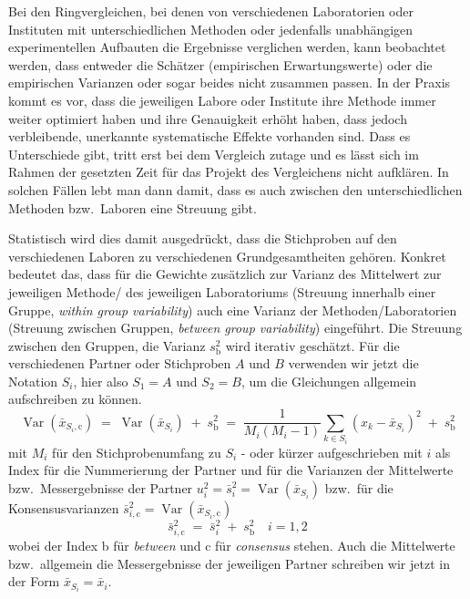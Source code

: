 Bei den Ringvergleichen, bei denen von verschiedenen Laboratorien oder Instituten mit
unterschiedlichen Methoden oder jedenfalls unabhängigen experimentellen Aufbauten die
Ergebnisse verglichen werden, kann beobachtet werden, dass entweder die
Schätzer (empirischen Erwartungswerte) oder die empirischen Varianzen oder sogar
beides nicht zusammen passen. In der Praxis kommt es vor, dass die jeweiligen
Labore oder Institute ihre Methode immer weiter optimiert haben und ihre Genauigkeit
erhöht haben, dass jedoch verbleibende, unerkannte systematische Effekte vorhanden sind.
Dass es Unterschiede gibt, tritt erst bei dem Vergleich zutage und es lässt sich
im Rahmen der gesetzten Zeit für das Projekt des Vergleichens nicht aufklären.
In solchen Fällen lebt man dann damit, dass es auch zwischen den unterschiedlichen
Methoden bzw.\ Laboren eine Streuung gibt.

Statistisch wird dies damit ausgedrückt, dass die Stichproben auf den verschiedenen
Laboren zu verschiedenen Grundgesamtheiten gehören.
Konkret bedeutet das, dass für die Gewichte zusätzlich zur Varianz des Mittelwert
zur jeweiligen Methode/ des jeweiligen Laboratoriums
(Streuung innerhalb einer Gruppe, \textsl{within group variability})
auch eine Varianz der Methoden/Laboratorien (Streuung zwischen Gruppen,
\textsl{between group variability}) eingeführt.
Die Streuung zwischen den Gruppen, die Varianz $s^2_\mathrm{b}$ wird
iterativ geschätzt. Für die verschiedenen Partner oder Stichproben $A$ und $B$
verwenden wir jetzt die Notation $S_i$, hier also $S_1 = A$ und $S_2 = B$, um
die Gleichungen allgemein aufschreiben zu können.
\begin{equation*}
\operatorname{Var}(\bar x_{S_i,\mathrm{c}}) \; = \;
\operatorname{Var}(\bar x_{S_i}) \; + \; s^2_\mathrm{b} \; = \;
\frac{1}{M_i (M_i - 1)} \sum\limits_{k \in S_i}
\left( x_{k} - \bar x_{S_i} \right)^2
\; + \; s^2_\mathrm{b}
\end{equation*}
mit $M_i$ für den Stichprobenumfang zu $S_i$ -
oder kürzer aufgeschrieben mit $i$ als Index für die Nummerierung der Partner
und für die Varianzen der Mittelwerte bzw.\ Messergebnisse
der Partner
$u^2_i = \bar s^2_i = \operatorname{Var}(\bar x_{S_i})$
bzw.\ für die Konsensusvarianzen
$\bar s^2_{i,\mathrm{c}} = \operatorname{Var}(\bar x_{S_i,\mathrm{c}})$
\begin{equation}
\bar s^2_{i,\mathrm{c}} \; = \; \bar s^2_i \; + \; s^2_\mathrm{b}
\quad i=1,2
\label{eq:consensusVariability}
\end{equation}
wobei der Index b für \textsl{between} und c für \textsl{consensus}
stehen. Auch die Mittelwerte bzw.\ allgemein die Messergebnisse der
jeweiligen Partner schreiben wir jetzt in der Form $\bar x_{S_i} = \bar x_i$.

